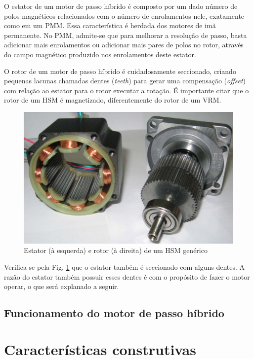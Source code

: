 \documentclass[portugues]{sobraep}
\begin{document}
	O estator de um motor de passo híbrido é composto por um dado número de polos magnéticos relacionados com o número de enrolamentos nele, exatamente como em um PMM. Essa característica é herdada dos motores de imã permanente. No PMM, admite-se que para melhorar a resolução de passo, basta adicionar mais enrolamentos ou adicionar mais pares de polos no rotor, através do campo magnético produzido nos enrolamentos deste estator. 
	
	O rotor de um motor de passo híbrido é cuidadosamente seccionado, criando pequenas lacunas chamadas dentes (\textit{teeth}) para gerar uma compensação (\textit{offset}) com relação ao estator para o rotor executar a rotação. É importante citar que o rotor de um HSM é magnetizado, diferentemente do rotor de um VRM.
	
	\begin{figure}[!h]
		\centering
		\includegraphics[scale=.4]{Images/hsmreal2.png}
		\caption{Estator (à esquerda) e rotor (à direita) de um HSM genérico \cite{ieeeRusso}}
		\label{HSMestatorrotor}
	\end{figure} 
	
	Verifica-se pela Fig. \ref{HSMestatorrotor} que o estator também é seccionado com alguns dentes. A razão do estator também possuir esses dentes é com o propósito de fazer o motor operar, o que será explanado a seguir.
	
	\subsection{Funcionamento do motor de passo híbrido}
	

\section{Características construtivas}
\end{document}
